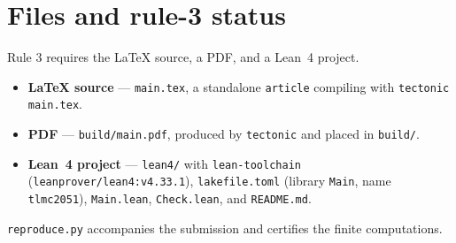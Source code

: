 \documentclass[11pt]{article}
\theoremstyle{definition}
\theoremstyle{remark}
\begin{document}
\section*{Files and rule-3 status}

Rule 3 requires the LaTeX source, a PDF, and a Lean~4 project.

\begin{itemize}
\item \textbf{LaTeX source} --- \texttt{main.tex}, a standalone \texttt{article}
compiling with \texttt{tectonic main.tex}.
\item \textbf{PDF} --- \texttt{build/main.pdf}, produced by \texttt{tectonic}
and placed in \texttt{build/}.
\item \textbf{Lean~4 project} --- \texttt{lean4/} with \texttt{lean-toolchain}
(\texttt{leanprover/lean4:v4.33.1}), \texttt{lakefile.toml} (library \texttt{Main},
name \texttt{tlmc2051}), \texttt{Main.lean}, \texttt{Check.lean}, and
\texttt{README.md}.
\end{itemize}

\noindent
\texttt{reproduce.py} accompanies the submission and certifies the finite
computations.
\end{document}
